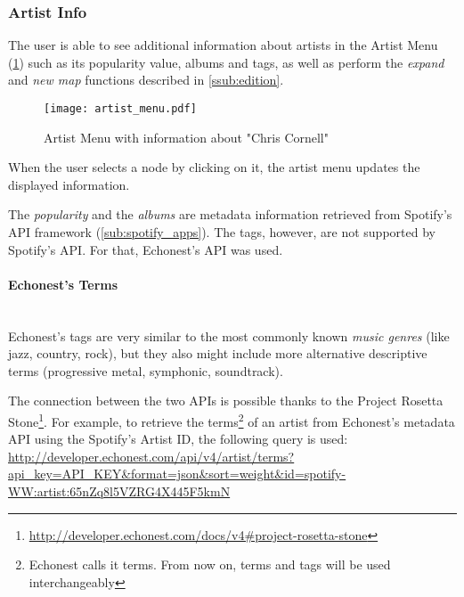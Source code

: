 
    \subsubsection{Artist Info} %
      \label{ssub:artist_info}
      The user is able to see additional information about artists in the Artist Menu (\ref{fig:artist_menu}) such as its popularity value, albums and tags, as well as perform the \emph{expand} and \emph{new map} functions described in \ref{ssub:edition}.
      \begin{figure}[tb]
        \begin{center}
          \texttt{[image: artist\_menu.pdf]}
        \end{center}
        \caption{Artist Menu with information about "Chris Cornell"}
        \label{fig:artist_menu}
      \end{figure}
      When the user selects a node by clicking on it, the artist menu updates the displayed information.

      The \emph{popularity} and the \emph{albums} are metadata information retrieved from Spotify's API framework (\ref{sub:spotify_apps}).
      The tags, however, are not supported by Spotify's API.
      For that, Echonest's API was used.

      \paragraph{Echonest's Terms} \hfill \\
      Echonest's tags are very similar to the most commonly known \emph{music genres} (like jazz, country, rock), but they also might include more alternative descriptive terms (progressive metal, symphonic, soundtrack).

      The connection between the two APIs is possible thanks to the Project Rosetta Stone\footnote{\url{http://developer.echonest.com/docs/v4\#project-rosetta-stone}}.
      For example, to retrieve the terms\footnote{Echonest calls it terms. From now on, terms and tags will be used interchangeably} of an artist from Echonest's metadata API using the Spotify's Artist ID, the following query is used: \\

      \url{
        http://developer.echonest.com/api/v4/artist/terms?api_key=API_KEY&format=json&sort=weight&id=spotify-WW:artist:65nZq8l5VZRG4X445F5kmN
      } \\

